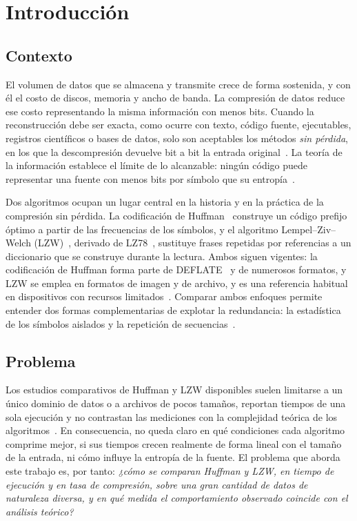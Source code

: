 \section{Introducción}
\label{sec:introduccion}

\subsection{Contexto}
El volumen de datos que se almacena y transmite crece de forma sostenida, y con él el costo
de discos, memoria y ancho de banda. La compresión de datos reduce ese costo representando la
misma información con menos bits. Cuando la reconstrucción debe ser exacta, como ocurre con texto, código
fuente, ejecutables, registros científicos o bases de datos, solo son aceptables los
métodos \emph{sin pérdida}, en los que la descompresión devuelve bit a bit la entrada
original~\cite{sayood2017,salomon2010}. La teoría de la información establece el límite de lo
alcanzable: ningún código puede representar una fuente con menos bits por símbolo que su
entropía~\cite{shannon1948}.

Dos algoritmos ocupan un lugar central en la historia y en la práctica de la compresión sin
pérdida. La codificación de Huffman~\cite{huffman1952} construye un código prefijo óptimo a
partir de las frecuencias de los símbolos, y el algoritmo Lempel--Ziv--Welch
(LZW)~\cite{welch1984}, derivado de LZ78~\cite{ziv1978}, sustituye frases repetidas por
referencias a un diccionario que se construye durante la lectura. Ambos siguen vigentes: la
codificación de Huffman forma parte de DEFLATE~\cite{rfc1951} y de numerosos formatos, y LZW
se emplea en formatos de imagen y de archivo, y es una referencia habitual en dispositivos con
recursos limitados~\cite{jambek2014,bjaras2019}. Comparar ambos enfoques permite entender dos
formas complementarias de explotar la redundancia: la estadística de los símbolos aislados y la
repetición de secuencias~\cite{bell1989,jayasankar2021}.

\subsection{Problema}
Los estudios comparativos de Huffman y LZW disponibles suelen limitarse a un único dominio de
datos o a archivos de pocos tamaños, reportan tiempos de una sola ejecución y no contrastan
las mediciones con la complejidad teórica de los
algoritmos~\cite{jambek2014,fauzan2022,btoush2008}. En consecuencia, no queda claro en qué
condiciones cada algoritmo comprime mejor, si sus tiempos crecen realmente de forma lineal con
el tamaño de la entrada, ni cómo influye la entropía de la fuente.
El problema que aborda este trabajo es, por tanto: \emph{¿cómo se comparan Huffman y LZW, en
tiempo de ejecución y en tasa de compresión, sobre una gran cantidad de datos de naturaleza
diversa, y en qué medida el comportamiento observado coincide con el análisis teórico?}


